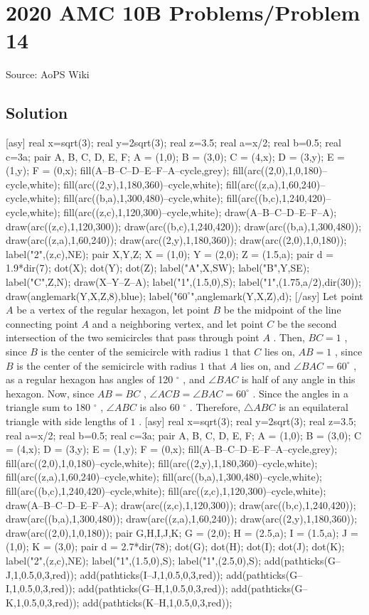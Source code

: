 \documentclass[12pt]{article}
\begin{document}
\section*{{2020 AMC 10B Problems/Problem 14}}
Source: AoPS Wiki

\subsection*{Solution}
[asy] real x=sqrt(3); real y=2sqrt(3); real z=3.5; real a=x/2; real b=0.5; real c=3a; pair A, B, C, D, E, F; A = (1,0); B = (3,0); C = (4,x); D = (3,y); E = (1,y); F = (0,x); fill(A--B--C--D--E--F--A--cycle,grey); fill(arc((2,0),1,0,180)--cycle,white); fill(arc((2,y),1,180,360)--cycle,white); fill(arc((z,a),1,60,240)--cycle,white); fill(arc((b,a),1,300,480)--cycle,white); fill(arc((b,c),1,240,420)--cycle,white); fill(arc((z,c),1,120,300)--cycle,white); draw(A--B--C--D--E--F--A); draw(arc((z,c),1,120,300)); draw(arc((b,c),1,240,420)); draw(arc((b,a),1,300,480)); draw(arc((z,a),1,60,240)); draw(arc((2,y),1,180,360)); draw(arc((2,0),1,0,180)); label("2",(z,c),NE); pair X,Y,Z; X = (1,0); Y = (2,0); Z = (1.5,a); pair d = 1.9*dir(7); dot(X); dot(Y); dot(Z); label("A",X,SW); label("B",Y,SE); label("C",Z,N); draw(X--Y--Z--A); label("1",(1.5,0),S); label("1",(1.75,a/2),dir(30)); draw(anglemark(Y,X,Z,8),blue); label("$60^\circ$",anglemark(Y,X,Z),d); [/asy] Let point $A$ be a vertex of the regular hexagon, let point $B$ be the midpoint of the line connecting point $A$ and a neighboring vertex, and let point $C$ be the second intersection of the two semicircles that pass through point $A$ . Then, $BC = 1$ , since $B$ is the center of the semicircle with radius $1$ that $C$ lies on, $AB = 1$ , since $B$ is the center of the semicircle with radius $1$ that $A$ lies on, and $\angle BAC = 60^\circ$ , as a regular hexagon has angles of 120 $^\circ$ , and $\angle BAC$ is half of any angle in this hexagon. Now, since $AB = BC$ , $\angle ACB = \angle BAC = 60^\circ$ . Since the angles in a triangle sum to 180 $^\circ$ , $\angle ABC$ is also 60 $^\circ$ . Therefore, $\triangle ABC$ is an equilateral triangle with side lengths of $1$ . [asy] real x=sqrt(3); real y=2sqrt(3); real z=3.5; real a=x/2; real b=0.5; real c=3a; pair A, B, C, D, E, F; A = (1,0); B = (3,0); C = (4,x); D = (3,y); E = (1,y); F = (0,x); fill(A--B--C--D--E--F--A--cycle,grey); fill(arc((2,0),1,0,180)--cycle,white); fill(arc((2,y),1,180,360)--cycle,white); fill(arc((z,a),1,60,240)--cycle,white); fill(arc((b,a),1,300,480)--cycle,white); fill(arc((b,c),1,240,420)--cycle,white); fill(arc((z,c),1,120,300)--cycle,white); draw(A--B--C--D--E--F--A); draw(arc((z,c),1,120,300)); draw(arc((b,c),1,240,420)); draw(arc((b,a),1,300,480)); draw(arc((z,a),1,60,240)); draw(arc((2,y),1,180,360)); draw(arc((2,0),1,0,180)); pair G,H,I,J,K; G = (2,0); H = (2.5,a); I = (1.5,a); J = (1,0); K = (3,0); pair d = 2.7*dir(78); dot(G); dot(H); dot(I); dot(J); dot(K); label("2",(z,c),NE); label("1",(1.5,0),S); label("1",(2.5,0),S); add(pathticks(G--J,1,0.5,0,3,red)); add(pathticks(I--J,1,0.5,0,3,red)); add(pathticks(G--I,1,0.5,0,3,red)); add(pathticks(G--H,1,0.5,0,3,red)); add(pathticks(G--K,1,0.5,0,3,red)); add(pathticks(K--H,1,0.5,0,3,red)); 
\end{document}
